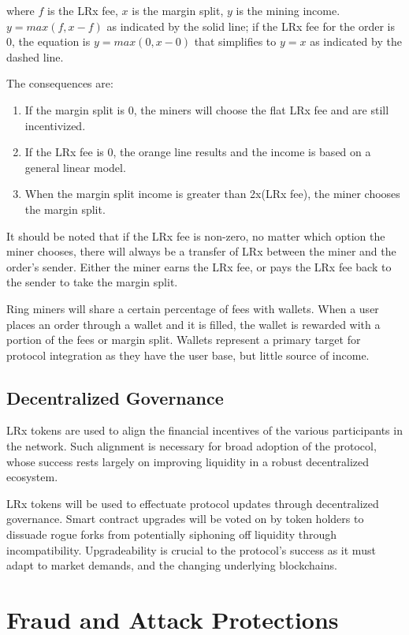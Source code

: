 \documentclass[UTF8,nofonts]{article}
\begin{document}
\begin{multicols}{2}
where $f$ is the LRx fee, $x$ is the margin split, $y$ is the mining income. $y=max(f, x-f)$ as indicated by the solid line; if the LRx fee for the order is $0$, the equation is $y=max(0, x - 0)$ that simplifies to $y=x$ as indicated by the dashed line.

The consequences are:  
\begin{enumerate}
	\item If the margin split is 0, the miners will choose the flat LRx fee and are still incentivized. 
	\item If the LRx fee is 0, the orange line results and the income is based on a general linear model.
	\item When the margin split income is greater than 2x(LRx fee), the miner chooses the margin split.
\end{enumerate}

It should be noted that if the LRx fee is non-zero, no matter which option the miner chooses, there will always be a transfer of LRx between the miner and the order's sender. Either the miner earns the LRx fee, or pays the LRx fee back to the sender to take the margin split.

Ring miners will share a certain percentage of fees with wallets. When a user places an order through a wallet and it is filled, the wallet is rewarded with a portion of the fees or margin split. Wallets represent a primary target for protocol integration as they have the user base, but little source of income. 

\subsection{Decentralized Governance}
LRx tokens are used to align the financial incentives of the various participants in the network. Such alignment is necessary for broad adoption of the protocol, whose success rests largely on improving liquidity in a robust decentralized ecosystem.

LRx tokens will be used to effectuate protocol updates through decentralized governance. Smart contract upgrades will be voted on by token holders to dissuade rogue forks from potentially siphoning off liquidity through incompatibility. Upgradeability is crucial to the protocol's success as it must adapt to market demands, and the changing underlying blockchains.

\section{Fraud and Attack Protections}


\end{multicols}
\end{document}
